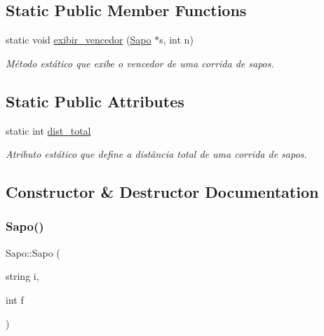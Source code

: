 \subsection*{Static Public Member Functions}
\begin{DoxyCompactItemize}
\item 
static void \hyperlink{classSapo_a9a223c19115eee492036e71f796ce6d2}{exibir\+\_\+vencedor} (\hyperlink{classSapo}{Sapo} $\ast$s, int n)
\begin{DoxyCompactList}\small\item\em Método estático que exibe o vencedor de uma corrida de sapos. \end{DoxyCompactList}\end{DoxyCompactItemize}
\subsection*{Static Public Attributes}
\begin{DoxyCompactItemize}
\item 
\mbox{\label{classSapo_a126ead3f437199b995147eed2e2ca916}} 
static int \hyperlink{classSapo_a126ead3f437199b995147eed2e2ca916}{dist\+\_\+total}
\begin{DoxyCompactList}\small\item\em Atributo estático que define a distância total de uma corrida de sapos. \end{DoxyCompactList}\end{DoxyCompactItemize}


\subsection{Constructor \& Destructor Documentation}
\mbox{\label{classSapo_a221aae78cfa9b71f5888b1a37e5f80af}} 
\subsubsection{\texorpdfstring{Sapo()}{Sapo()}}
{\footnotesize\ttfamily Sapo\+::\+Sapo (\begin{DoxyParamCaption}\item[{string}]{i,  }\item[{int}]{f }\end{DoxyParamCaption})}



